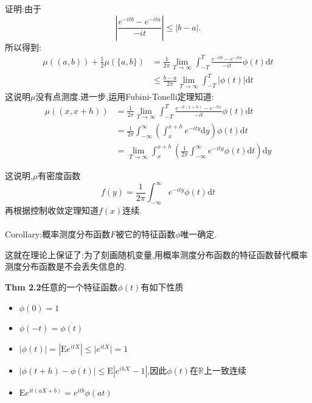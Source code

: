 \begin{frame}
	证明:由于\begin{equation}
		\left|\frac{e^{-itb}-e^{-ita}}{-it} \right|\leqslant |b-a|.
	\end{equation}
	所以得到:
	\begin{equation}
		\begin{split}
			\mu((a,b)) + \frac{1}{2}\mu(\{a,b\}) &= \frac{1}{2\pi}\lim_{T\to\infty}\int_{-T}^{T}\frac{e^{-itb}-e^{-ita}}{-it}\phi(t)\mathrm{d}t \\
			&\leqslant \frac{b-a}{2\pi}\lim_{T\to\infty}\int_{-T}^{T}|\phi(t)|\mathrm{d}t
		\end{split}
	\end{equation}
	这说明$\mu$没有点测度.进一步,运用Fubini-Tonelli定理知道:
	\begin{equation}
		\begin{split}
			\mu((x,x+h)) &= \frac{1}{2\pi}\lim_{T\to\infty}\int_{-T}^{T}\frac{e^{-it(x+h)}-e^{-itx}}{-it}\phi(t)\mathrm{d}t \\
			&= \frac{1}{2\pi}\int_{-\infty}^{\infty}\left(\int_{x}^{x+h}e^{-ity}\mathrm{d}y\right)\phi(t)\mathrm{d}t \\
			&= \lim_{T\to\infty} \int_{x}^{x+h}\left(\frac{1}{2\pi}\int_{-\infty}^{\infty}e^{-ity}\phi(t)\mathrm{d}t \right)\mathrm{d}y
		\end{split}
	\end{equation}
\end{frame}

\begin{frame}
	这说明,$\mu$有密度函数\begin{equation}
		f(y) = \frac{1}{2\pi}\int_{-\infty}^{\infty}e^{-ity}\phi(t)\mathrm{d}t
	\end{equation}
	再根据控制收敛定理知道$f(x)$连续.
	\\ \hspace*{\fill} \\%
	\alert{Corollary}:概率测度分布函数$F$被它的特征函数$\phi$唯一确定.
	
	这就在理论上保证了:为了刻画随机变量,用概率测度分布函数的特征函数替代概率测度分布函数是不会丢失信息的.
\end{frame}

\begin{frame}
	\begin{block}{\textbf{Thm 2.2}任意的一个特征函数$\phi(t)$有如下性质}
	\begin{itemize}
		\item $\phi(0) = 1$
		\item $\phi(-t) = \overline{\phi(t)}$
		\item $|\phi(t)|=|\mathrm{E}e^{itX}|\leqslant \mathrm|e^{itX}| = 1$
		\item $|\phi(t+h)-\phi(t)|\leqslant \mathrm{E}|e^{ihX}-1|$,因此$\phi(t)$在$\mathbb{R}$上一致连续
		\item $\mathrm{E}e^{it(aX+b)} = e^{itb}\phi(at)$
	\end{itemize}
	
	\end{block}
\end{frame}



